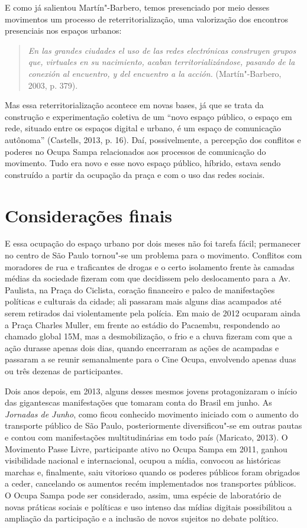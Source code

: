 E como já salientou Martín"-Barbero, temos presenciado por meio desses
movimentos um processo de reterritorialização, uma valorização dos
encontros presenciais nos espaços urbanos:

\begin{quote}
\emph{En las grandes ciudades el uso de las redes electrónicas
construyen grupos que, virtuales en su nacimiento, acaban
territorializándose, pasando de la conexión al encuentro, y del
encuentro a la acción.} (Martín"-Barbero, 2003, p. 379).
\end{quote}

Mas essa reterritorialização acontece em novas bases, já que se trata da
construção e experimentação coletiva de um ``novo espaço público, o
espaço em rede, situado entre os espaços digital e urbano, é um espaço
de comunicação autônoma'' (Castells, 2013, p. 16). Daí, possivelmente, a
percepção dos conflitos e poderes no Ocupa Sampa relacionados aos
processos de comunicação do movimento. Tudo era novo e esse novo espaço
público, híbrido, estava sendo construído a partir da ocupação da praça
e com o uso das redes sociais.

\section{Considerações finais}

\noindent{}E essa ocupação do espaço urbano por dois meses não foi tarefa fácil;
permanecer no centro de São Paulo tornou"-se um problema para o
movimento. Conflitos com moradores de rua e traficantes de drogas e o
certo isolamento frente às camadas médias da sociedade fizeram com que
decidissem pelo deslocamento para a Av. Paulista, na Praça do Ciclista,
coração financeiro e palco de manifestações políticas e culturais da
cidade; ali passaram mais alguns dias acampados até serem retirados dai
violentamente pela polícia. Em maio de 2012 ocuparam ainda a Praça
Charles Muller, em frente ao estádio do Pacaembu, respondendo ao chamado
global 15M, mas a desmobilização, o frio e a chuva fizeram com que a
ação durasse apenas dois dias, quando encerraram as ações de acampadas e
passaram a se reunir semanalmente para o Cine Ocupa, envolvendo apenas
duas ou três dezenas de participantes.

Dois anos depois, em 2013, alguns desses mesmos jovens
protagonizaram o início das gigantescas manifestações que tomaram conta
do Brasil em junho. As \emph{Jornadas de Junho}, como ficou conhecido
movimento iniciado com o aumento do transporte público de São Paulo,
posteriormente diversificou"-se em outras pautas e contou com
manifestações multitudinárias em todo país (Maricato, 2013). O Movimento
Passe Livre, participante ativo no Ocupa Sampa em 2011, ganhou
visibilidade nacional e internacional, ocupou a mídia, convocou as
históricas marchas e, finalmente, saiu vitorioso quando os poderes
públicos foram obrigados a ceder, cancelando os aumentos recém
implementados nos transportes públicos. O Ocupa Sampa pode ser
considerado, assim, uma espécie de laboratório de novas práticas sociais
e políticas e uso intenso das mídias digitais possibilitou a ampliação
da participação e a inclusão de novos sujeitos no debate político.

